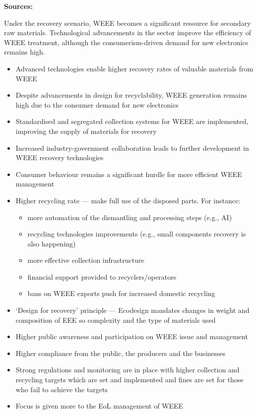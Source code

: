 \wasteSubsubsecWEEE 
\textbf{Sources:}~\cite{parajuly2019weee,un2023weee,forti2020weee,eu2012weee, eu2012weeerecast, narbonperpina2020weee}

Under the recovery scenario, WEEE becomes a significant resource for secondary raw materials. Technological advancements in the sector improve the efficiency of WEEE treatment, although the consumerism-driven demand for new electronics remains high.

\begin{itemize}
  \item Advanced technologies enable higher recovery rates of valuable materials from WEEE
  \item Despite advancements in design for recyclability, WEEE generation remains high due to the consumer demand for new electronics
  \item Standardised and segregated collection systems for WEEE are implemented, improving the supply of materials for recovery
  \item Increased industry-government collaboration leads to further development in WEEE recovery technologies
  \item Consumer behaviour remains a significant hurdle for more efficient WEEE management
  \item Higher recycling rate --- make full use of the disposed parts. For instance:
        \begin{itemize}
          \item more automation of the dismantling and processing steps (e.g., AI)
          \item recycling technologies improvements (e.g., small components recovery is also happening)
          \item more effective collection infrastructure
          \item financial support provided to recyclers/operators
          \item bans on WEEE exports push for increased domestic recycling~\cite{huisman2015weee}
        \end{itemize}
  \item `Design for recovery' principle --- Ecodesign mandates changes in weight and composition of EEE so complexity and the type of materials used
  \item Higher public awareness and participation on WEEE issue and management
  \item Higher compliance from the public, the producers and the businesses
  \item Strong regulations and monitoring are in place with higher collection and recycling targets which are set and implemented and fines are set for those who fail to achieve the targets
  \item Focus is given more to the EoL management of WEEE
\end{itemize}



